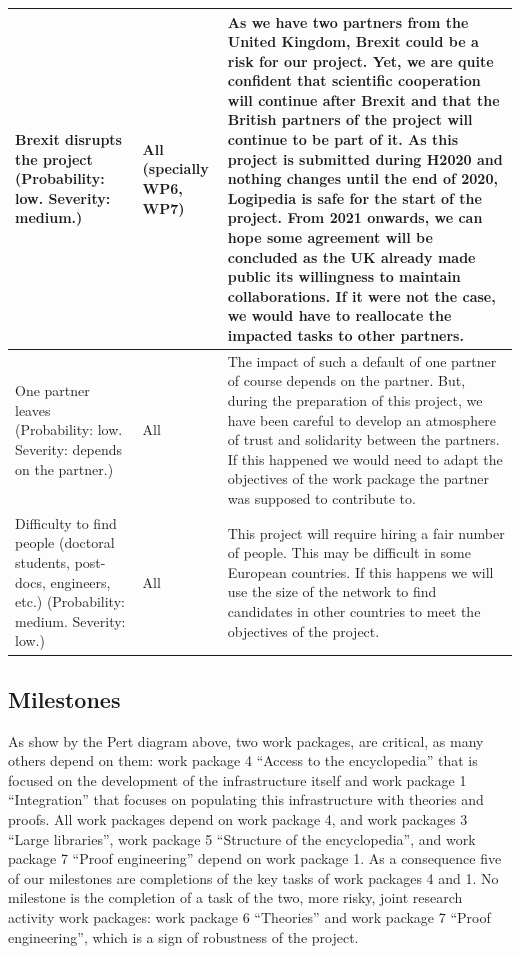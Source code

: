 \begin{longtable*}{|p{0.30\textwidth}|p{0.10\textwidth}|p{0.50\textwidth}|}
\hline
Brexit disrupts the project (Probability: low. Severity: medium.)
&
All (specially WP6, WP7)
&
As we have two partners from the United Kingdom, Brexit could be a risk
for our project. Yet, we are quite confident
that scientific
cooperation will continue after Brexit and that the British partners
of the project will continue to be part of it.
As this project is submitted during H2020 and nothing changes until
the end of 2020, Logipedia is safe for the start of the project. From
2021 onwards, we can hope some agreement will be concluded as the UK
already made public its willingness to maintain collaborations.
If it were not the
case, we would have to reallocate the impacted tasks to other partners. 
\\
\hline
One partner leaves (Probability: low. Severity: depends on the partner.)
&
All
&
The impact of such a default of one partner of course depends on the
partner. But, during the preparation of this project, we have been
careful to develop an atmosphere of trust and solidarity between the
partners. If this happened
we would need to adapt the objectives of the work package the partner
was supposed to contribute to.
\\
\hline
Difficulty to find people (doctoral students, post-docs, engineers, etc.)
(Probability: medium. Severity: low.)
&
All
&
This project will require hiring a fair number of people. This may be
difficult in some European countries. If this happens we will use the
size of the network to find candidates in other countries to meet
the objectives of the project.\\
\hline
\end{longtable*}

\subsection*{Milestones}\label{sec:milestones}

As show by the Pert diagram above, two work packages, are critical, as
many others depend on them: work package 4 ``Access to the
encyclopedia'' that is focused on the development of the
infrastructure itself and work package 1 ``Integration'' that focuses
on populating this infrastructure with theories and proofs. All work
packages depend on work package 4, and work packages 3 ``Large
libraries'', work package 5 ``Structure of the encyclopedia'', and
work package 7 ``Proof engineering'' depend on work package 1.  As a
consequence five of our milestones are completions of the key tasks of
work packages 4 and 1.  No milestone is the completion of a task of
the two, more risky, joint research activity work packages: work
package 6 ``Theories'' and work package 7 ``Proof engineering'', which
is a sign of robustness of the project.
  

